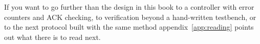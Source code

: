 If you want to go further than the design in this book \textemdash{} to a controller with error
counters and ACK checking, to verification beyond a hand-written testbench, or to the next protocol
built with the same method \textemdash{} appendix~\ref{app:reading} points out what there is to read
next.
